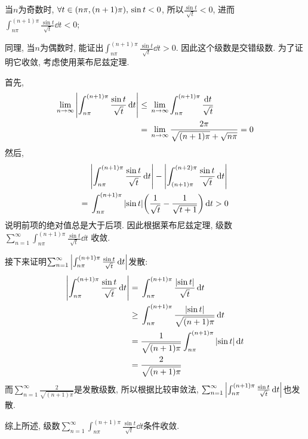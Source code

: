 \documentclass[12pt]{ctexart}
\begin{document}
\section{}
当$n$为奇数时, $\forall t\in\qty(n\pi,(n+1)\pi),\,\sin{t}<0$, 所以$\frac{\sin{t}}{\sqrt{t}}<0$, 进而$\int_{n\pi}^{(n+1)\pi}\frac{\sin{t}}{\sqrt{t}}\dd{t}<0$;\par
同理, 当$n$为偶数时, 能证出$\int_{n\pi}^{(n+1)\pi}\frac{\sin{t}}{\sqrt{t}}\dd{t}>0$. 因此这个级数是交错级数. 为了证明它收敛, 考虑使用莱布尼兹定理.\par
首先,
\begin{align*}
	\lim_{n\rightarrow\infty}\abs{\int_{n\pi}^{(n+1)\pi}\frac{\sin{t}}{\sqrt{t}}\dd{t}}\le{}&\lim_{n\rightarrow\infty}\int_{n\pi}^{(n+1)\pi}\frac{\dd{t}}{\sqrt{t}}\\
	={}&\lim_{n\rightarrow\infty}\frac{2\pi}{\sqrt{(n+1)\pi}+\sqrt{n\pi}}=0
\end{align*}
然后, 
\begin{align*}
	{}&\abs{\int_{n\pi}^{(n+1)\pi}\frac{\sin{t}}{\sqrt{t}}\dd{t}}-\abs{\int_{(n+1)\pi}^{(n+2)\pi}\frac{\sin{t}}{\sqrt{t}}\dd{t}}\\
	={}&\int_{n\pi}^{(n+1)\pi}\abs{\sin{t}}\qty(\frac{1}{\sqrt{t}}-\frac{1}{\sqrt{t+1}})\dd{t}>0
\end{align*}
说明前项的绝对值总是大于后项. 因此根据莱布尼兹定理, 级数$\sum_{n=1}^{\infty}\int_{n\pi}^{(n+1)\pi}\frac{\sin{t}}{\sqrt{t}}\dd{t}$ 收敛.\par
接下来证明$\sum_{n=1}^{\infty}\abs{\int_{n\pi}^{(n+1)\pi}\frac{\sin{t}}{\sqrt{t}}\dd{t}}$发散:
\begin{align*}
	\abs{\int_{n\pi}^{(n+1)\pi}\frac{\sin{t}}{\sqrt{t}}\dd{t}}={}&\int_{n\pi}^{(n+1)\pi}\frac{\abs{\sin{t}}}{\sqrt{t}}\dd{t}\\
	\ge{}&\int_{n\pi}^{(n+1)\pi}\frac{\abs{\sin{t}}}{\sqrt{(n+1)\pi}}\dd{t}\\
	={}&\frac{1}{\sqrt{(n+1)\pi}}\int_{n\pi}^{(n+1)\pi}\abs{\sin{t}}\dd{t}\\
	={}&\frac{2}{\sqrt{(n+1)\pi}}
\end{align*}
而$\sum_{n=1}^{\infty}\frac{2}{\sqrt{(n+1)\pi}}$是发散级数, 所以根据比较审敛法, $\sum_{n=1}^{\infty}\abs{\int_{n\pi}^{(n+1)\pi}\frac{\sin{t}}{\sqrt{t}}\dd{t}}$也发散.\par
综上所述, 级数$\sum_{n=1}^{\infty}\int_{n\pi}^{(n+1)\pi}\frac{\sin{t}}{\sqrt{t}}\dd{t}$条件收敛.\par
\end{document}
